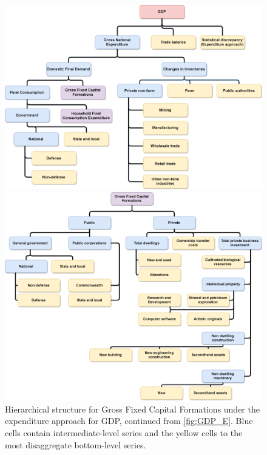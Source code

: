 \documentclass[graybox]{svmult}
\begin{document}
\begin{figure}
	\centering	\includegraphics[width=.9\textwidth]{Figs/ExpenditureApproach.png}
	\caption{Hierarchical structure of the expenditure approach for GDP. The pink cell contains GDP, the most aggregate series. The blue and purple cells contain intermediate-level series with the series in the purple cells further disaggregated in Figures~\ref{fig:GFCF} and~\ref{fig:HFCE}. The yellow cells contain the most disaggregate bottom-level series.}\label{fig:GDP_E}
%
	\centering
	\includegraphics[width=.9\textwidth]{Figs/GFCF.png}
	\caption{Hierarchical structure for Gross Fixed Capital Formations under the expenditure approach for GDP, continued from \autoref{fig:GDP_E}. Blue cells contain intermediate-level series and the yellow cells to the most disaggregate bottom-level series.}\label{fig:GFCF}
\end{figure}
\end{document}
